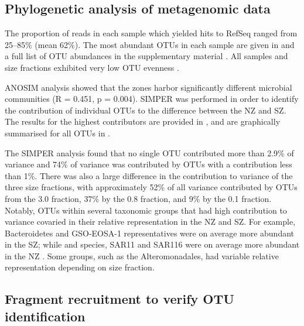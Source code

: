 \subsection{Phylogenetic analysis of metagenomic data}

The proportion of reads in each sample which yielded hits to RefSeq ranged from 25--85\% (mean 62\%).
The most abundant \acp{OTU} in each sample are given in  and a full list of \ac{OTU} abundances in the supplementary material .
All samples and size fractions exhibited very low \ac{OTU} evenness .




\ac{ANOSIM} analysis showed that the zones harbor significantly different microbial communities (R = 0.451, p = 0.004). 
\ac{SIMPER} was performed in order to identify the contribution of individual \acp{OTU} to the difference between the \ac{NZ} and \ac{SZ}. 
The results for the highest contributors are provided in , and are graphically summarised for all \acp{OTU} in .




The \ac{SIMPER} analysis found that no single \ac{OTU} contributed more than 2.9\% of variance and 74\% of variance was contributed by \acp{OTU} with a contribution less than 1\%. 
There was also a large difference in the contribution to variance of the three size fractions, with approximately 52\% of all variance contributed by \acp{OTU} from the 3.0 \micron{} fraction, 37\% by the 0.8 \micron{} fraction, and 9\% by the 0.1 \micron{} fraction.
Notably, \acp{OTU} within several taxonomic groups that had high contribution to variance covaried in their relative representation in the \ac{NZ} and \ac{SZ}.
For example, Bacteroidetes and GSO-EOSA-1 representatives were on average more abundant in the \ac{SZ}; while  and  species, SAR11 and SAR116 were on average more abundant in the \ac{NZ} .
Some groups, such as the Alteromonadales, had variable relative representation depending on size fraction.

\subsection{Fragment recruitment to verify \ac{OTU} identification}


